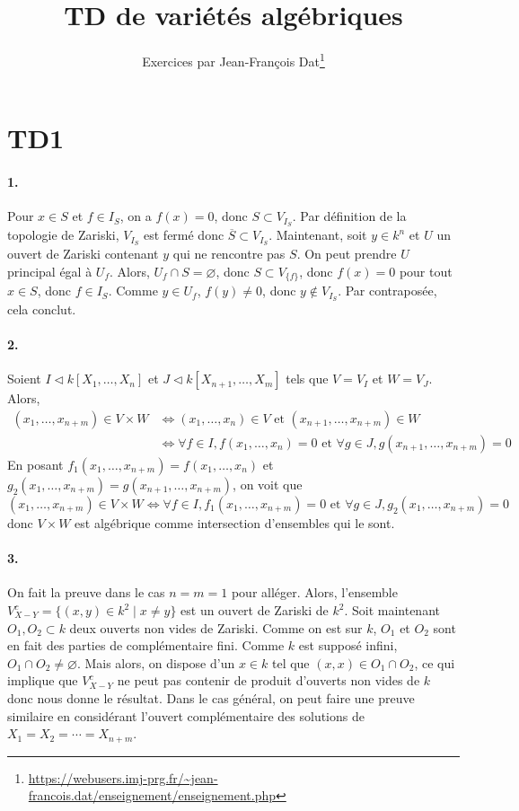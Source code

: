 \documentclass{article}
\title{TD de variétés algébriques}
\author{Exercices par Jean-François Dat\footnote{\protect\url{https://webusers.imj-prg.fr/~jean-francois.dat/enseignement/enseignement.php}}}
\date{}
\begin{document}
\maketitle

\section{TD1}

\paragraph{1.} Pour $x \in S$ et $f \in I_S$, on a $f(x) = 0$, donc $S \subset V_{I_S}$. Par définition de la topologie de Zariski, $V_{I_S}$ est fermé donc $\overline{S} \subset V_{I_S}$. Maintenant, soit $y \in k^n$ et $U$ un ouvert de Zariski contenant $y$ qui ne rencontre pas $S$. On peut prendre $U$ principal égal à $U_f$. Alors, $U_f \cap S = \varnothing$, donc $S \subset V_{\{f\}}$, donc $f(x) = 0$ pour tout $x \in S$, donc $f \in I_S$. Comme $y \in U_f$, $f(y) \ne 0$, donc $y \notin V_{I_S}$. Par contraposée, cela conclut.

\paragraph{2.} Soient $I \lhd k[X_1,\dots,X_n]$ et $J \lhd k[X_{n+1},\dots,X_m]$ tels que $V = V_I$ et $W = V_J$. Alors,
\begin{align*}
    (x_1,\dots,x_{n+m}) \in V \times W & \iff (x_1,\dots,x_n) \in V \text{ et } (x_{n+1},\dots,x_{n+m}) \in W \\
    & \iff \forall f \in I, f(x_1,\dots,x_n) = 0 \text{ et } \forall g \in J, g(x_{n+1}, \dots, x_{n+m}) = 0
\end{align*}
En posant $f_1(x_1,\dots,x_{n+m}) = f(x_1,\dots,x_n)$ et $g_2(x_1,\dots,x_{n+m}) = g(x_{n+1},\dots,x_{n+m})$, on voit que
\[(x_1,\dots,x_{n+m}) \in V \times W \iff \forall f \in I, f_1(x_1,\dots,x_{n+m}) = 0 \text{ et } \forall g\in J, g_2(x_1,\dots,x_{n+m}) = 0\]
donc $V \times W$ est algébrique comme intersection d'ensembles qui le sont.

\paragraph{3.} On fait la preuve dans le cas $n=m=1$ pour alléger. Alors, l'ensemble $V_{X-Y}^c = \{(x,y) \in k^2 \mid x \ne y\}$ est un ouvert de Zariski de $k^2$. Soit maintenant $O_1, O_2 \subset k$ deux ouverts non vides de Zariski. Comme on est sur $k$, $O_1$ et $O_2$ sont en fait des parties de complémentaire fini. Comme $k$ est supposé infini, $O_1 \cap O_2 \ne \varnothing$. Mais alors, on dispose d'un $x \in k$ tel que $(x,x) \in O_1 \cap O_2$, ce qui implique que $V_{X-Y}^c$ ne peut pas contenir de produit d'ouverts non vides de $k$ donc nous donne le résultat. Dans le cas général, on peut faire une preuve similaire en considérant l'ouvert complémentaire des solutions de $X_1 = X_2 = \cdots = X_{n+m}$.
\end{document}
